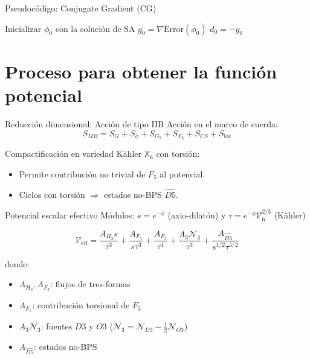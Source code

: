 \documentclass[aspectratio=169]{beamer} %
\begin{document}
\begin{frame}{Pseudocódigo: Conjugate Gradient (CG)}
    \begin{algorithm}[H]
        \DontPrintSemicolon
        \caption{Refinamiento local con CG}
        Inicializar \(\phi_0\) con la solución de SA\;
        \(g_0 = \nabla \text{Error}(\phi_0)\)\;
        \(d_0 = -g_0\)\;
    \end{algorithm}
\end{frame}

\section{Proceso para obtener la función potencial}

\begin{frame}{Reducción dimensional: Acción de tipo IIB}
    Acción en el marco de cuerda:
    \[
    S_{IIB} = S_G + S_\phi + S_{G_3} + S_{F_5} + S_{CS} + S_{\text{loc}}
    \]
    
    Compactificación en variedad Kähler \(\mathbb{X}_6\) con torsión:
    \begin{itemize}
        \item Permite contribución no trivial de \(F_5\) al potencial.
        \item Ciclos con torsión \(\Rightarrow\) estados no-BPS \(\widehat{D5}\).
    \end{itemize}
\end{frame}

\begin{frame}{Potencial escalar efectivo}
    Módulos: \(s = e^{-\phi}\) (axio-dilatón) y \(\tau = e^{-\phi} \mathcal{V}_6^{2/3}\) (Kähler)
    
    \[
    \mathcal{V}_{\text{eff}} = \frac{A_{H_3}s}{\tau^3} + \frac{A_{F_3}}{s\tau^3} + \frac{A_{F_5}}{\tau^4} + \frac{A_3\mathcal{N}_3}{\tau^3} + \frac{A_{\widehat{D5}}}{s^{1/2}\tau^{5/2}}
    \]
    
    donde:
    \begin{itemize}
        \item \(A_{H_3}, A_{F_3}\): flujos de tres-formas
        \item \(A_{F_5}\): contribución torsional de \(F_5\)
        \item \(A_3\mathcal{N}_3\): fuentes \(D3\) y \(O3\) (\(\mathcal{N}_3 = \mathcal{N}_{D3} - \frac{1}{2}\mathcal{N}_{O3}\))
        \item \(A_{\widehat{D5}}\): estados no-BPS
    \end{itemize}
\end{frame}
\end{document}
